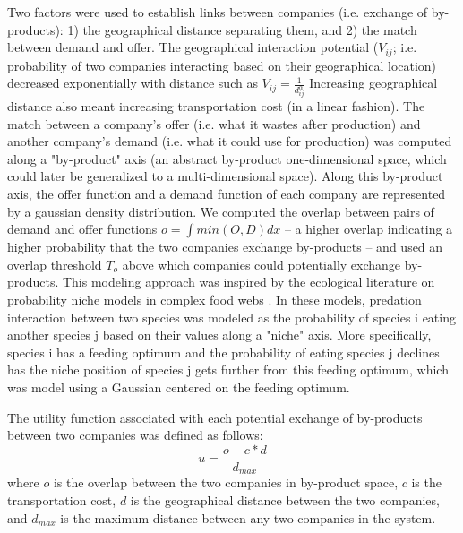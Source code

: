 \documentclass[fleqn,10pt]{wlscirep}
\begin{document}
Two factors were used to establish links between companies (i.e. exchange of by-products): 1) the geographical distance separating them, and 2) the match between demand and offer. The geographical interaction potential ($V_{ij}$; i.e. probability of two companies interacting based on their geographical location) decreased exponentially with distance such as $V_{ij}=\frac{1}{d_{ij}^{\alpha}}$ %
Increasing geographical distance also meant increasing transportation cost (in a linear fashion). The match between a company's offer (i.e. what it wastes after production) and another company's demand (i.e. what it could use for production) was computed along a "by-product" axis (an abstract by-product one-dimensional space, which could later be generalized to a multi-dimensional space). Along this by-product axis, the offer function and a demand function of each company are represented by a gaussian density distribution. We computed the overlap between pairs of demand and offer functions \(o = \int min(O,D) dx\) – a higher overlap indicating a higher probability that the two companies exchange by-products – and used an overlap threshold $T_o$ above which companies could potentially exchange by-products. This modeling approach was inspired by the ecological literature on probability niche models in complex food webs \cite{williams2000simple,williams2010probabilistic}. In these models, predation interaction between two species was modeled as the probability of species i eating another species j based on their values along a "niche" axis. More specifically, species i has a feeding optimum and the probability of eating species j declines has the niche position of species j gets further from this feeding optimum, which was model using a Gaussian centered on the feeding optimum. 

The utility function associated with each potential exchange of by-products between two companies was defined as follows:
\[u = \frac{o - c*d}{d_{max}}\]
where $o$ is the overlap between the two companies in by-product space, $c$ is the transportation cost, $d$ is the geographical distance between the two companies, and $d_{max}$ is the maximum distance between any two companies in the system.
\end{document}
